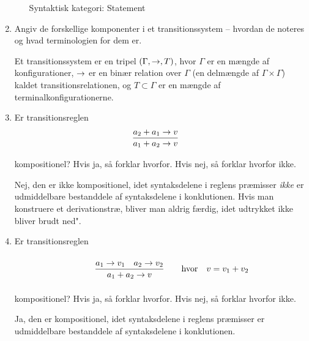 \documentclass[a4paper,10pt]{article}
\providecommand{\condinfrule}[3]
 {\parbox{5.5cm}{$$ {\frac{#1}{#2}}{\qquad
 #3} \hfill $$}}
\providecommand{\infrule}[2]
 {\parbox{4.5cm}{$$ \frac{#1}{#2}\hspace{.5cm}$$}}
\begin{document}
\begin{enumerate}
\begin{itemize}
\begin{svar}
Syntaktisk kategori: Statement
\end{svar}
\end{itemize}
\item Angiv de forskellige komponenter i et transitionssystem --
  hvordan de noteres og hvad terminologien for dem er.
\begin{svar}
Et transitionssystem er en tripel $(\Gamma, \rightarrow, T)$, hvor $\Gamma$ er en mængde af konfigurationer, $\rightarrow$ er en binær relation over $\Gamma$ (en delmængde af $\Gamma \times \Gamma$) kaldet transitionsrelationen, og $T \subset \Gamma$ er en mængde af terminalkonfigurationerne.
\end{svar}
\item Er transitionsreglen
\[ \infrule{a_{2} + a_{1} \ra v}{a_{1} + a_{2} \ra v} \]
kompositionel? Hvis ja, så forklar hvorfor. Hvis nej, så forklar hvorfor ikke.
\begin{svar}
Nej, den er ikke kompositionel, idet syntaksdelene i reglens præmisser \textit{ikke} er udmiddelbare bestanddele af syntaksdelene i konklutionen. Hvis man konstruere et derivationstræ, bliver man aldrig færdig, idet udtrykket ikke bliver brudt ned".
\end{svar}
\item Er transitionsreglen
\[ \condinfrule{a_{1} \ra v_1 \quad a_{2} \ra v_2}{a_{1} + a_{2} \ra v}{\text{hvor} \quad v = v_1 + v_2} \]
kompositionel? Hvis ja, så forklar hvorfor. Hvis nej, så forklar hvorfor ikke.
\begin{svar}
Ja, den er kompositionel, idet syntaksdelene i reglens præmisser er udmiddelbare bestanddele af syntaksdelene i konklutionen.

\end{svar}

\end{enumerate}
\end{document}
